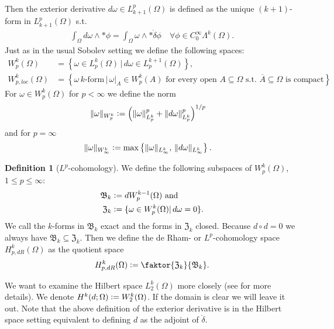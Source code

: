 \documentclass[12pt,a4paper]{article}
\theoremstyle{definition}
\newtheorem{definition}{Definition}
\newcommand{\lpcoho}{H^k_{p,dR}}
\newcommand{\norm}[2]{\lVert #1 \rVert_{#2}}
\begin{document}
Then the exterior derivative $ d\omega \in L^p_{k+1}(\Omega)$ is defined as
the unique $(k+1)$-form in $L^p_{k+1}(\Omega)$ s.t. 
\begin{align*}
\int_\Omega d\omega \wedge *\phi = \int_\Omega \omega \wedge 
*\mathring{\delta}\phi
\quad \forall \phi \in C_0^\infty \Lambda^{k}(\Omega).
\end{align*}
Just as in the usual Sobolev setting we define the following spaces:
\begin{align*}
W^k_p(\Omega) &= \left\{ \omega \in L^k_p(\Omega)\, | 
    \, d\omega \in L_p^{k+1}(\Omega) \right\}, \\ 
W^k_{p,loc}(\Omega) &= \left\{ \omega \, k \text{-form} \, | \,
\omega|_A \in W^k_p(A) \text{ for every open } A \subseteq \Omega 
\text{ s.t. } \overline{A} \subseteq \Omega \text{ is compact} %
\right\}.
\end{align*}
For $\omega \in W^k_p(\Omega)$ for $p<\infty$ we define the norm 
\begin{align*}
\lVert \omega \rVert _{W^k_p} &\vcentcolon= 
\left( \norm{\omega}{L^k_p}^p + \norm{d\omega}{L^k_p}^p \right)^{1/p}
\end{align*}
and for $p=\infty$
\begin{align*}
    \lVert \omega \rVert _{W^k_\infty} &\vcentcolon= 
    \max\left\{ \norm{\omega}{L^k_\infty},\, \norm{d\omega}{L^k_\infty}
    \right\}.
\end{align*}
    
\begin{definition}[$L^p$-cohomology]
    We define the following subspaces of $W^k_p(\Omega)$, $1\leq p \leq\infty$:
    \begin{align*}
        \mathfrak{B}_k &\vcentcolon= dW^{k-1}_p(\Omega) \text{ and} \\
        \mathfrak{Z}_k &\vcentcolon= \{ \omega \in W^k_p(\Omega)| 
        \, d\omega = 0\}.
    \end{align*}
    We call the $k$-forms in $\mathfrak{B}_k$ exact and the forms in 
    $\mathfrak{Z}_k$ closed. Because $d \circ d=0$ we always have  
    $\mathfrak{B}_k \subseteq \mathfrak{Z}_k$.
    Then we define the de Rham- or $L^p$-cohomology space $\lpcoho(\Omega)$ as 
    the quotient space
    \begin{align*}
        \lpcoho (\Omega) \vcentcolon= \faktor{\mathfrak{Z}_k}{\mathfrak{B}_k}.
    \end{align*}
\end{definition}
\vspace{0.5cm}
We want to examine the Hilbert space $L^k_2(\Omega)$ more closely
(see \cite[Sec. 6.2.6]{arnold} for more details).  
We denote $H^k(d;\Omega) \vcentcolon= W^k_2(\Omega)$. If the domain is clear
we will leave it out. Note that the above definition of the exterior derivative
is in the Hilbert space setting equivalent to defining $d$ as the adjoint
of $\mathring{\delta}$. 
\end{document}
